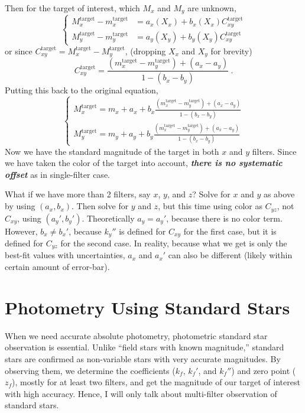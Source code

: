 Then for the target of interest, which $ M_x $ and $ M_y $ are unknown,
\begin{equation}
\begin{cases}
  M_x^\mathrm{target} - m_x^\mathrm{target} &= a_x(X_x) + b_x(X_x) C_{xy}^\mathrm{target} \\
  M_y^\mathrm{target} - m_y^\mathrm{target} &= a_y(X_y) + b_y(X_y) C_{xy}^\mathrm{target}
\end{cases}
\end{equation}
or since $ C_{xy}^\mathrm{target} = M_x^\mathrm{target} - M_y^\mathrm{target} $, (dropping $ X_x $ and $ X_y $ for brevity)
\begin{equation}
  C_{xy}^\mathrm{target} = \frac{(m_x^\mathrm{target} - m_y^\mathrm{target}) + (a_x - a_y)}{1 - (b_x - b_y)} ~.
\end{equation}
Putting this back to the original equation,
\begin{equation}\label{eq: 2-filter diff phot sol}
\begin{cases}
  M_x^\mathrm{target}
    = m_x + a_x + b_x \frac{(m_x^\mathrm{target} - m_y^\mathrm{target}) + (a_x - a_y)}{1 - (b_x - b_y)} \\
  M_y^\mathrm{target}
    = m_y + a_y + b_y \frac{(m_x^\mathrm{target} - m_y^\mathrm{target}) + (a_x - a_y)}{1 - (b_x - b_y)}
\end{cases}
\end{equation}
Now we have the standard magnitude of the target in both $ x $ and $ y $ filters. Since we have taken the color of the target into account, \textbf{\emph{there is no systematic offset}} as in single-filter case.

What if we have more than 2 filters, say $ x $, $ y $, and $ z $? Solve for $ x $ and $ y $ as above by using $ (a_x, b_x) $. Then solve for $ y $ and $ z $, but this time using color as $ C_{yz} $, not $ C_{xy} $, using $ (a_y', b_y') $. Theoretically $ a_y = a_y' $, because there is no color term. However, $ b_x \neq b_x' $, because $ k_y'' $ is defined for $ C_{xy} $ for the first case, but it is defined for $ C_{yz} $ for the second case. In reality, because what we get is only the best-fit values with uncertainties, $ a_x $ and $ a_x' $ can also be different (likely within certain amount of error-bar).




\section{Photometry Using Standard Stars}
When we need accurate absolute photometry, photometric standard star observation is essential. Unlike ``field stars with known magnitude,'' standard stars are confirmed as non-variable stars with very accurate magnitudes. By observing them, we determine the coefficients ($ k_f $, $ k_f' $, and $ k_f'' $) and zero point ($ z_f $), mostly for at least two filters, and get the magnitude of our target of interest with high accuracy. Hence, I will only talk about multi-filter observation of standard stars.

